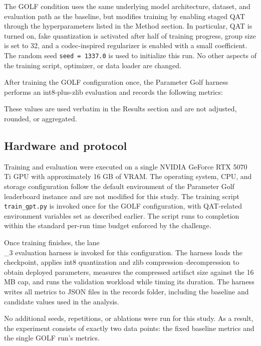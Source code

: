 \documentclass{article}
\begin{document}
The GOLF condition uses the same underlying model architecture, dataset, and evaluation path as the baseline, but modifies training by enabling staged QAT through the hyperparameters listed in the Method section. In particular, QAT is turned on, fake quantization is activated after half of training progress, group size is set to 32, and a codec-inspired regularizer is enabled with a small coefficient. The random seed \texttt{seed = 1337.0} is used to initialize this run. No other aspects of the training script, optimizer, or data loader are changed.

After training the GOLF configuration once, the Parameter Golf harness performs an int8-plus-zlib evaluation and records the following metrics:

\begin{itemize}

\end{itemize}

These values are used verbatim in the Results section and are not adjusted, rounded, or aggregated.

\subsection{Hardware and protocol}

\label{sec:hardware_and_protocol}

Training and evaluation were executed on a single NVIDIA GeForce RTX 5070 Ti GPU with approximately 16 GB of VRAM. The operating system, CPU, and storage configuration follow the default environment of the Parameter Golf leaderboard instance and are not modified for this study. The training script \texttt{train\_gpt.py} is invoked once for the GOLF configuration, with QAT-related environment variables set as described earlier. The script runs to completion within the standard per-run time budget enforced by the challenge.

Once training finishes, the lane\\_3 evaluation harness is invoked for this configuration. The harness loads the checkpoint, applies int8 quantization and zlib compression--decompression to obtain deployed parameters, measures the compressed artifact size against the 16 MB cap, and runs the validation workload while timing its duration. The harness writes all metrics to JSON files in the records folder, including the baseline and candidate values used in the analysis.

No additional seeds, repetitions, or ablations were run for this study. As a result, the experiment consists of exactly two data points: the fixed baseline metrics and the single GOLF run's metrics.
\end{document}
